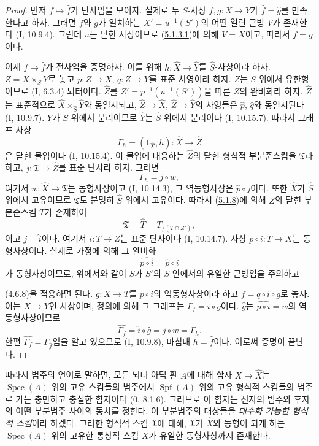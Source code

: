 \begin{proof}
먼저 $f\mapsto\widehat f$가 단사임을 보이자. 실제로 두
$S$-사상 $f,g:X\to Y$가 $\widehat f=\widehat g$를 만족한다고
하자. 그러면 $f$와 $g$가 일치하는 $X'=u^{-1}(S')$의 어떤 열린
근방 $V$가 존재한다 (I, 10.9.4). 그런데 $u$는 닫힌 사상이므로
(\hyperref[III.5.1.3.1-fr]{5.1.3.1})에 의해 $V=X$이고, 따라서
$f=g$이다.

이제 $f\mapsto\widehat f$가 전사임을 증명하자. 이를 위해
$h:\widehat X\to\widehat Y$를 $\widehat S$-사상이라 하자.
$Z=X\times_S Y$로 놓고 $p:Z\to X$, $q:Z\to Y$를 표준 사영이라
하자. $Z$는 $S$ 위에서 유한형이므로 (I, 6.3.4) 뇌터이다.
$\widehat Z$를 $Z'=p^{-1}(u^{-1}(S'))$을 따른 $Z$의 완비화라
하자. $\widehat Z$는 표준적으로
$\widehat X\times_{\widehat S}\widehat Y$와 동일시되고,
$\widehat Z\to\widehat X$, $\widehat Z\to\widehat Y$의 사영들은
$\widehat p$, $\widehat q$와 동일시된다 (I, 10.9.7).
$Y$가 $S$ 위에서 분리이므로 $\widehat Y$는 $\widehat S$ 위에서
분리이다 (I, 10.15.7). 따라서 그래프 사상
\[
\Gamma_h=(1_{\widehat X},h):\widehat X\to\widehat Z
\]
은 닫힌 몰입이다 (I, 10.15.4). 이 몰입에 대응하는
$\widehat Z$의 닫힌 형식적 부분준스킴을 $\mathfrak T$라 하고,
$j:\mathfrak T\to\widehat Z$를 표준 단사라 하자. 그러면
\[
\Gamma_h=j\circ w,
\]
여기서 $w:\widehat X\to\mathfrak T$는 동형사상이고
(I, 10.14.3), 그 역동형사상은 $\widehat p\circ j$이다. 또한
$\widehat X$가 $\widehat S$ 위에서 고유이므로 $\mathfrak T$도
분명히 $\widehat S$ 위에서 고유이다. 따라서
(\hyperref[III.5.1.8-fr]{5.1.8})에 의해 $Z$의 닫힌 부분준스킴
$T$가 존재하여
\[
\mathfrak T=\widehat T=T_{/(T\cap Z')},
\]
이고 $j=\widehat i$이다. 여기서 $i:T\to Z$는 표준 단사이다
(I, 10.14.7). 사상 $p\circ i:T\to X$는 동형사상이다. 실제로
가정에 의해 그 완비화
\[
\widehat{p\circ i}=\widehat p\circ\widehat i
\]
가 동형사상이므로, 위에서와 같이 $S$가 $S'$의 $S$ 안에서의
유일한 근방임을 주의하고


(4.6.8)을 적용하면 된다. $g:X\to T$를 $p\circ i$의
역동형사상이라 하고 $f=q\circ i\circ g$로 놓자. 이는
$X\to Y$인 사상이며, 정의에 의해 그 그래프는
$\Gamma_f=i\circ g$이다. $\widehat g$는
$\widehat{p\circ i}=w$의 역동형사상이므로
\[
\widehat{\Gamma_f}=\widehat i\circ\widehat g
=j\circ w=\Gamma_h.
\]
한편 $\widehat{\Gamma_f}=\Gamma_{\widehat f}$임을 알고 있으므로
(I, 10.9.8), 마침내 $h=\widehat f$이다. 이로써 증명이 끝난다.
\end{proof}

따라서 범주의 언어로 말하면, 모든 뇌터 아딕 환 $A$에 대해
함자 $X\mapsto\widehat X$는 $\operatorname{Spec}(A)$ 위의 고유
스킴들의 범주에서 $\operatorname{Spf}(A)$ 위의 고유 형식적
스킴들의 범주로 가는 충만하고 충실한 함자이다 ($0$, 8.1.6).
그러므로 이 함자는 전자의 범주와 후자의 어떤 부분범주 사이의
동치를 정한다. 이 부분범주의 대상들을 
\emph{대수화 가능한 형식적 스킴}이라 하겠다. 그러한 형식적 스킴
$\mathfrak X$에 대해, $\mathfrak X$가 $\widehat X$와 동형이 되게
하는 $\operatorname{Spec}(A)$ 위의 고유한 통상적 스킴 $X$가
유일한 동형사상까지 존재한다.

